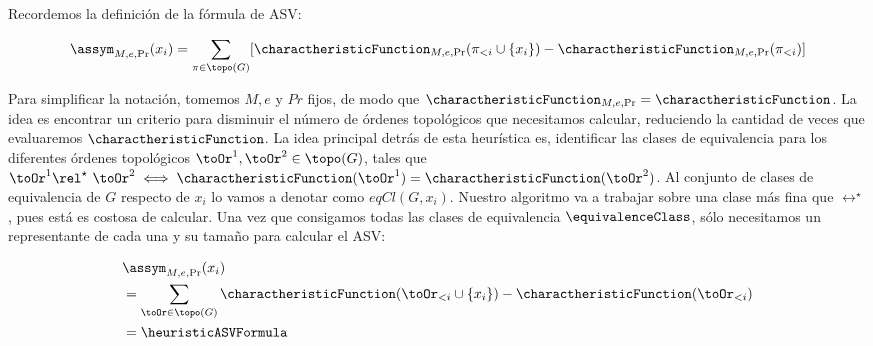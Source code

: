 \begin{comment}
Heuristica para ASV
    Introducción
    Cantidad de órdenes topológicos de un DAG
        Queremos topoSorts(polyTree) pues nuestra red es un polytree.
        Cantidad de ordenes topológicos para un “árbol”.
        Cantidad de clases de equivalencia para un “árbol”
\end{comment}


Recordemos la definición de la fórmula de ASV:

\begin{align*}
    \assym_{M,e,\Pr}(x_i) = \sum_{\pi \in \topo(G)} [\charactheristicFunction_{M,e,\Pr}(\pi_{<i} \cup \{x_i\}) - \charactheristicFunction_{M,e,\Pr}(\pi_{<i})] 
\end{align*}

Para simplificar la notación, tomemos $M,e$ y $Pr$ fijos, de modo que $\charactheristicFunction_{M,e,\Pr} = \charactheristicFunction$. La idea es encontrar un criterio para disminuir el número de órdenes topológicos que necesitamos calcular, reduciendo la cantidad de veces que evaluaremos $\charactheristicFunction$. La idea principal detrás de esta heurística es, identificar las clases de equivalencia para los diferentes órdenes topológicos $\toOr^1, \toOr^2 \in \topo(G)$, tales que $\toOr^1 \rel^\star \ \toOr^2 \iff \charactheristicFunction(\toOr^1) = \charactheristicFunction(\toOr^2) $. Al conjunto de clases de equivalencia de $G$ respecto de $x_i$ lo vamos a denotar como $eqCl(G, x_i)$. Nuestro algoritmo va a trabajar sobre una clase más fina que $\rel^\star$, pues está es costosa de calcular. Una vez que consigamos todas las clases de equivalencia $\equivalenceClass$, sólo necesitamos un representante de cada una y su tamaño para calcular el ASV:

\begin{align*}
        &\assym_{M,e,\Pr}(x_i)\\
        &= \sum_{\toOr \in \topo(G)} \charactheristicFunction(\toOr_{<i} \cup \{x_i\}) - \charactheristicFunction(\toOr_{<i}) \\
        &=  \heuristicASVFormula
    \end{align*}



